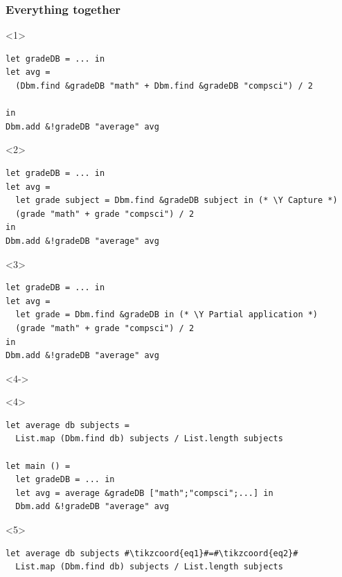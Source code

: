\documentclass[aspectratio=169,dvipsnames,svgnames,10pt]{beamer}
\newcommand\Y{{\color{Green}{\ding{52}}}}
\begin{document}
\begin{frame}[fragile]
  \frametitle{Everything together}
  
  \begin{onlyenv}<1>
\begin{verbatim}
let gradeDB = ... in
let avg =
  (Dbm.find &gradeDB "math" + Dbm.find &gradeDB "compsci") / 2

in
Dbm.add &!gradeDB "average" avg
\end{verbatim}
  \end{onlyenv}
  \begin{onlyenv}<2>
\begin{verbatim}
let gradeDB = ... in
let avg =
  let grade subject = Dbm.find &gradeDB subject in (* \Y Capture *)
  (grade "math" + grade "compsci") / 2
in
Dbm.add &!gradeDB "average" avg
\end{verbatim}
  \end{onlyenv}
  \begin{onlyenv}<3>
\begin{verbatim}
let gradeDB = ... in
let avg =
  let grade = Dbm.find &gradeDB in (* \Y Partial application *)
  (grade "math" + grade "compsci") / 2
in
Dbm.add &!gradeDB "average" avg
\end{verbatim}
  \end{onlyenv}
  \begin{onlyenv}<4->
    \begin{onlyenv}<4>%
\begin{verbatim}
let average db subjects = 
  List.map (Dbm.find db) subjects / List.length subjects

let main () =
  let gradeDB = ... in
  let avg = average &gradeDB ["math";"compsci";...] in
  Dbm.add &!gradeDB "average" avg
\end{verbatim}
    \end{onlyenv}%
    \begin{onlyenv}<5>%
\begin{verbatim}
let average db subjects #\tikzcoord{eq1}#=#\tikzcoord{eq2}#
  List.map (Dbm.find db) subjects / List.length subjects


\end{verbatim}
\end{onlyenv}
\end{onlyenv}
\end{frame}
\end{document}
